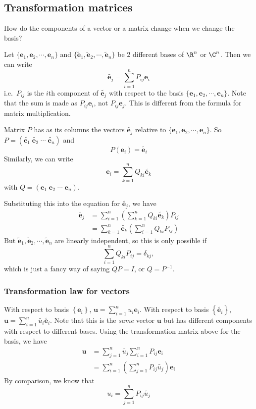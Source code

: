 \documentclass[a4paper]{article}
\begin{document}
\subsection{Transformation matrices}
How do the components of a vector or a matrix change when we change the basis?

Let $\{\mathbf{e}_1, \mathbf{e}_2, \cdots, \mathbf{e}_n\}$ and $\{\tilde{\mathbf{e}}_1, \tilde{\mathbf{e}}_2,\cdots, \tilde{\mathbf{e}}_n\}$ be 2 different bases of $\R^n$ or $\C^n$. Then we can write
\[
  \tilde{\mathbf{e}_j} = \sum_{i = 1}^n P_{ij}\mathbf{e}_i
\]
i.e.\ $P_{ij}$ is the $i$th component of $\tilde{\mathbf{e}_j}$ with respect to the basis $\{\mathbf{e}_1, \mathbf{e}_2, \cdots, \mathbf{e}_n\}$. Note that the sum is made as $P_{ij}\mathbf{e}_i$, not $P_{ij}\mathbf{e}_j$. This is different from the formula for matrix multiplication.

Matrix $P$ has as its columns the vectors $\tilde{\mathbf{e}_j}$ relative to $\{\mathbf{e}_1, \mathbf{e}_2, \cdots, \mathbf{e}_n\}$. So $P = (\tilde{\mathbf{e}_1}\; \tilde{\mathbf{e}_2}\; \cdots \; \tilde{\mathbf{e}_n})$ and
\[
  P(\mathbf{e}_i) = \tilde{\mathbf{e}_i}
\]
Similarly, we can write
\[
  \mathbf{e}_i = \sum_{k = 1}^nQ_{ki} \tilde{\mathbf{e}_k}
\]
with $Q = (\mathbf{e}_1\; \mathbf{e}_2\;\cdots\;\mathbf{e}_n)$.

Substituting this into the equation for $\tilde{\mathbf{e}_j}$, we have
\begin{align*}
  \tilde{\mathbf{e}_j} &= \sum_{i = 1}^n\left(\sum_{k = 1}^{n} Q_{ki}\tilde{\mathbf{e}_k}\right)P_{ij}\\
  &= \sum_{k = 1}^n \tilde{\mathbf{e}_k} \left(\sum_{i = 1}^n Q_{ki}P_{ij}\right)
\end{align*}
But $\tilde{\mathbf{e}}_1, \tilde{\mathbf{e}}_2,\cdots, \tilde{\mathbf{e}}_n$ are linearly independent, so this is only possible if
\[
  \sum_{i = 1}^n Q_{ki}P_{ij} = \delta_{kj},
\]
which is just a fancy way of saying $QP = I$, or $Q = P^{-1}$.
\subsubsection{Transformation law for vectors}
With respect to basis $\left\{\mathbf{e}_i\right\}$, $\mathbf{u} = \sum_{i = 1}^n u_i\mathbf{e}_i$.
With respect to basis $\left\{\tilde{\mathbf{e}_i}\right\}$, $\mathbf{u} = \sum_{i = 1}^n \tilde{u_i}\tilde{\mathbf{e}_i}$. Note that this is the \emph{same} vector $\mathbf{u}$ but has different components with respect to different bases. Using the transformation matrix above for the basis, we have
\begin{align*}
  \mathbf{u} &= \sum_{j= 1}^n \tilde{u_j} \sum_{i = 1}^{n}P_{ij}\mathbf{e}_i\\
  &= \sum_{i = 1}^n \left(\sum_{j = 1}^n P_{ij}\tilde{u_j}\right) \mathbf{e}_i
\end{align*}
By comparison, we know that
\[
  u_i = \sum_{j = 1}^n P_{ij}\tilde{u_j}
\]
\end{document}
